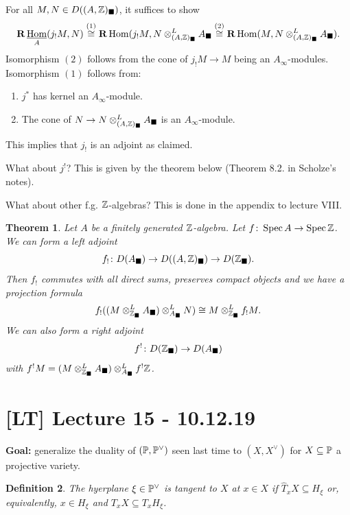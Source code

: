 \documentclass[A4paper, british, reqno]{amsart}
\theoremstyle{darkgreentheorem}
\newtheorem{thm}{Theorem}[section]
\theoremstyle{darkbluedefinition}
\newtheorem{defn}[thm]{Definition}
\theoremstyle{darkredexample}
\theoremstyle{remark}
\DeclareMathOperator{\Hom}{Hom}
\DeclareMathOperator{\Spec}{Spec}
\DeclareMathOperator{\ihom}{\underline{Hom}}
\newcommand{\1}{\mathbbm{1}}
\newcommand{\ot}{\otimes}
\newcommand{\dual}{^{\vee}}
\newcommand{\sub}{\subseteq}
\newcommand{\usolid}{_{\blacksquare}}
\begin{document}
For all $M,N\in D((A,\Z)\usolid)$, it suffices to show
\[ \bfR\ihom_{A}(j_{!}M,N)\overset{(1)}{\cong} \bfR\Hom(j_{!}M,N\ot_{(A,\Z)\usolid}^{L}A\usolid\overset{(2)}{\cong} \bfR\Hom(M,N\ot_{(A,\Z)\usolid}^{L}A\usolid ). \]
Isomorphism $(2)$ follows from the cone of $j_{!}M\to M$ being an $A_{\infty}$-modules.
Isomorphism $(1)$ follows from:
\begin{enumerate}
    \item $j^{*}$ has kernel an $A_{\infty}$-module.
    \item The cone of $N\to N\ot_{(A,\Z)\usolid}^{L}A\usolid$ is an $A_{\infty}$-module.
\end{enumerate}
This implies that $j_{!}$ is an adjoint as claimed.

What about $j^{!}$? This is given by the theorem below (Theorem 8.2. in Scholze's notes).

What about other f.g. $\mathbb{Z}$-algebras?
This is done in the appendix to lecture VIII.

\begin{thm}
    Let $A$ be a finitely generated $\mathbb{Z}$-algebra.
    Let $f\colon \Spec{A}\to \Spec{\Z}$.
    We can form a left adjoint
    \[ f_{!}\colon D(A\usolid)\to D((A,\Z)\usolid)\to D(\Z\usolid). \]
    Then $f_{!}$ commutes with all direct sums, preserves compact objects and we have a projection formula
    \[ f_{!}((M\ot^{L}_{\Z\usolid}A\usolid)\ot^{L}_{A\usolid} N)\cong M\ot_{\Z\usolid}^{L}f_{!}M. \]
    We can also form a right adjoint
    \[ f^{!}\colon D(\Z\usolid)\to D(A\usolid) \]
    with $f^{!}M=(M\ot_{\Z\usolid}^{L}A\usolid )\ot_{A\usolid}^{L}f^{!}\Z$.
\end{thm}

\section{[LT] Lecture 15 - 10.12.19}

\textbf{Goal:} generalize the duality of $(\P,\P\dual)$ seen last time to $(X,X\dual)$ for $X\sub \P$ a projective variety.

\begin{defn}
    The hyerplane $\xi\in \P\dual$ is \textit{tangent to $X$ at $x\in X$} if $\hat{T}_{x}X\sub H_{\xi}$ or, equivalently, $x\in H_{\xi}$ and $T_{x}X\sub T_{x}H_{\xi}$.
\end{defn}
\end{document}
